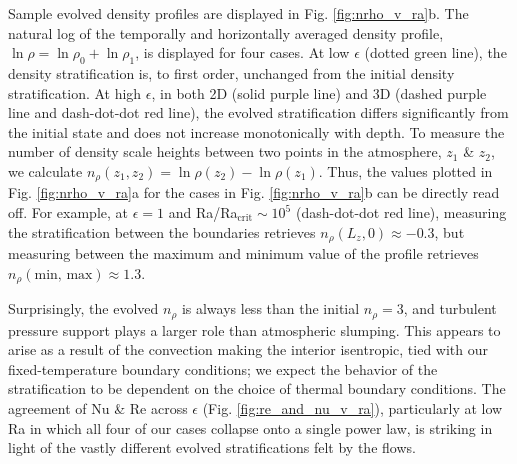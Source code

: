\documentclass[aps, prfluids, onecolumn, notitlepage, nofootinbib, groupedaddress, amsfonts, amssymb, amsmath]{revtex4-1}
\begin{document}
Sample evolved density profiles are displayed in Fig. \ref{fig:nrho_v_ra}b.
The natural log of the temporally and horizontally averaged density profile, 
$\ln \rho = \ln \rho_0 + \ln\rho_1$, is displayed for four cases.  At low $\epsilon$
(dotted green line), the density stratification is, to first order, unchanged from
the initial density stratification.  At high $\epsilon$, in both 2D (solid purple line)
and 3D (dashed purple line and dash-dot-dot red line), the evolved stratification differs
significantly from the initial state and does not increase monotonically with depth.
To measure the number of density scale heights between two points in the atmosphere,
$z_1$ \& $z_2$, we calculate $n_\rho(z_1, z_2) = \ln\rho(z_2) - \ln\rho(z_1)$.  Thus,
the values plotted in Fig. \ref{fig:nrho_v_ra}a for the cases in Fig. \ref{fig:nrho_v_ra}b
can be directly read off.  For example, at $\epsilon = 1$ and Ra/Ra$_{\text{crit}} \sim 10^5$
(dash-dot-dot red line), measuring the stratification between the boundaries retrieves
$n_\rho(L_z, 0) \approx -0.3$, but measuring between the maximum and minimum value of
the profile retrieves $n_\rho(\text{min, max}) \approx 1.3$.

Surprisingly, the evolved $n_\rho$ is always less than the initial $n_\rho = 3$,
and turbulent pressure support plays a larger role than atmospheric slumping.
This appears to arise as a result of the convection making the interior isentropic,
tied with our fixed-temperature boundary conditions; 
we expect the behavior of the stratification to be dependent on the choice of
thermal boundary conditions.
The agreement of Nu \& Re across $\epsilon$ (Fig. \ref{fig:re_and_nu_v_ra}), 
particularly at low Ra in which all four of our cases collapse onto a single
power law, is striking in light of the vastly different evolved stratifications
felt by the flows. 
\end{document}
